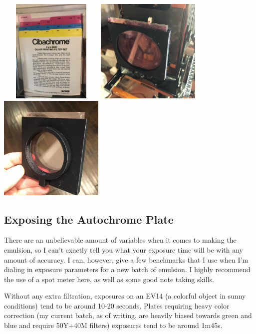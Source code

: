 \documentclass[11pt]{article}
\begin{document}
\begin{center}
\includegraphics[width=5cm, height=5cm]{img/part3_5.jpg}
\includegraphics[width=5cm, height=5cm]{img/part3_6.jpg}
\includegraphics[width=5cm, height=5cm]{img/part3_7.jpg}
\end{center}

\subsection{Exposing the Autochrome Plate}

There are an unbelievable amount of variables when it comes to making the emulsion, so I can't exactly tell you what your exposure time will be with any amount of accuracy. I can, however, give a few benchmarks that I use when I'm dialing in exposure parameters for a new batch of emulsion. I highly recommend the use of a spot meter here, as well as some good note taking skills.\newline

Without any extra filtration, exposures on an EV14 (a colorful object in sunny conditions) tend to be around 10-20 seconds. Plates requiring heavy color correction (my current batch, as of writing, are heavily biased towards green and blue and require 50Y+40M filters) exposures tend to be around 1m45s.\newline
\end{document}
